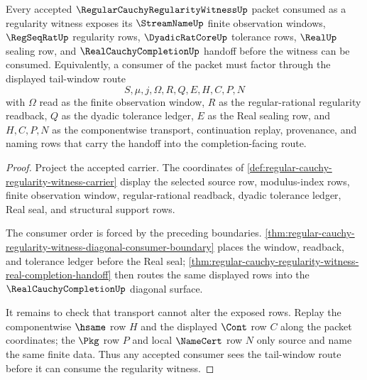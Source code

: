\begin{theorem}
\label{thm:regularcauchyregularitywitness-tail-window-regularity}
Every accepted $\RegularCauchyRegularityWitnessUp$ packet consumed as a regularity witness exposes its $\StreamNameUp$ finite observation windows, $\RegSeqRatUp$ regularity rows, $\DyadicRatCoreUp$ tolerance rows, $\RealUp$ sealing row, and $\RealCauchyCompletionUp$ handoff before the witness can be consumed. Equivalently, a consumer of the packet must factor through the displayed tail-window route
$$
S,\mu,j,\Omega,R,Q,E,H,C,P,N
$$
with $\Omega$ read as the finite observation window, $R$ as the regular-rational regularity readback, $Q$ as the dyadic tolerance ledger, $E$ as the Real sealing row, and $H,C,P,N$ as the componentwise transport, continuation replay, provenance, and naming rows that carry the handoff into the completion-facing route.
\end{theorem}
\begin{proof}
Project the accepted carrier. The coordinates of \autoref{def:regular-cauchy-regularity-witness-carrier} display the selected source row, modulus-index rows, finite observation window, regular-rational readback, dyadic tolerance ledger, Real seal, and structural support rows.

The consumer order is forced by the preceding boundaries. \autoref{thm:regular-cauchy-regularity-witness-diagonal-consumer-boundary} places the window, readback, and tolerance ledger before the Real seal; \autoref{thm:regular-cauchy-regularity-witness-real-completion-handoff} then routes the same displayed rows into the $\RealCauchyCompletionUp$ diagonal surface.

It remains to check that transport cannot alter the exposed rows. Replay the componentwise $\hsame$ row $H$ and the displayed $\Cont$ row $C$ along the packet coordinates; the $\Pkg$ row $P$ and local $\NameCert$ row $N$ only source and name the same finite data. Thus any accepted consumer sees the tail-window route before it can consume the regularity witness.
\end{proof}

